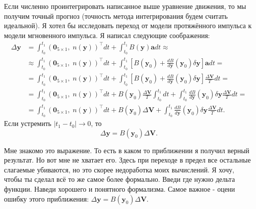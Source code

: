 \documentclass[12pt,a4paper]{extarticle}
\begin{document}
Если численно проинтегрировать написанное выше уравнение движения, то мы получим точный прогноз (точность метода интегрирования будем считать идеальной). Я хотел бы исследовать переход от модели протяжённого импульса к модели мгновенного импульса. Я написал следующие соображения:
\begin{align*}
    \Delta \mathbf{y} &= \int_{t_0}^{t_1} ( \mathbf{0}_{5 \times 1}, \;  n(\mathbf{y}))^\top dt + \int_{t_0}^{t_1} B(\mathbf{y}) \mathbf{a} dt \approx \\
    &\approx \int_{t_0}^{t_1} ( \mathbf{0}_{5 \times 1}, \;  n(\mathbf{y}))^\top dt + \int_{t_0}^{t_1} \left[ B(\mathbf{y}_0) + \frac{dB}{d \mathbf{y}} (\mathbf{y}_0) \delta \mathbf{y} \right] \mathbf{a} dt = \\
    &= \int_{t_0}^{t_1} ( \mathbf{0}_{5 \times 1}, \;  n(\mathbf{y}))^\top dt + \int_{t_0}^{t_1} \left[ B(\mathbf{y}_0) + \frac{dB}{d \mathbf{y}} (\mathbf{y}_0) \delta \mathbf{y} \right] \frac{\Delta \mathbf{V}}{T} dt = \\
    &= \int_{t_0}^{t_1} ( \mathbf{0}_{5 \times 1}, \;  n(\mathbf{y}))^\top dt + B(\mathbf{y}_0) \frac{\Delta \mathbf{V}}{T}  \int_{t_0}^{t_1} dt + \int_{t_0}^{t_1} \frac{dB}{d \mathbf{y}} (\mathbf{y}_0) \delta \mathbf{y} \frac{\Delta \mathbf{V}}{T} dt = \\
    &= \int_{t_0}^{t_1} ( \mathbf{0}_{5 \times 1}, \;  n(\mathbf{y}))^\top dt + B(\mathbf{y}_0) \Delta \mathbf{V} + \int_{t_0}^{t_1} \frac{dB}{d \mathbf{y}} (\mathbf{y}_0) \delta \mathbf{y} \frac{\Delta \mathbf{V}}{T} dt.
\end{align*} 
Если устремить $| t_1 - t_0 | \longrightarrow 0$, то
\begin{equation*}
    \Delta \mathbf{y} = B(\mathbf{y}_0) \Delta \mathbf{V}.
\end{equation*}

Мне знакомо это выражение. То есть в каком то приближении я получил верный результат. Но вот мне не хватает его. Здесь при переходе в предел все остальные слагаемые убиваются, но это скорее недоработка моих вычислений. Я хочу, чтобы ты сделал всё то же самое более формально. Введи где нужно дельта функции. Наведи хорошего и понятного формализма. Самое важное - оцени ошибку этого приближения: $\Delta \mathbf{y} = B(\mathbf{y}_0) \Delta \mathbf{V}$.
\end{document}
